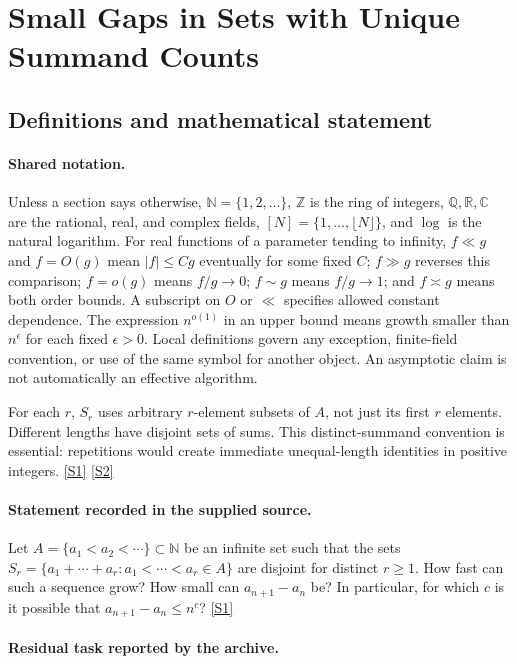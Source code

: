 \documentclass[11pt,a4paper]{article}
\newcommand{\N}{\mathbb{N}}
\newcommand{\Z}{\mathbb{Z}}
\newcommand{\Q}{\mathbb{Q}}
\newcommand{\R}{\mathbb{R}}
\newcommand{\C}{\mathbb{C}}
\newcommand{\sref}[2]{\hyperlink{source:#1:#2}{[S#2]}}
\begin{document}
\section{Small Gaps in Sets with Unique Summand Counts}\label{statement}


\subsection{Definitions and mathematical statement}

\paragraph{Shared notation.}Unless a section says otherwise, $\N=\{1,2,\ldots\}$,
$\Z$ is the ring of integers, $\Q,\R,\C$ are the rational, real, and complex
fields, $[N]=\{1,\ldots,\lfloor N\rfloor\}$, and $\log$ is the natural
logarithm. For real functions of a parameter tending to infinity,
$f\ll g$ and $f=O(g)$ mean $|f|\leq Cg$ eventually for some fixed $C$;
$f\gg g$ reverses this comparison; $f=o(g)$ means $f/g\to0$;
$f\sim g$ means $f/g\to1$; and $f\asymp g$ means both order bounds.
A subscript on $O$ or $\ll$ specifies allowed constant dependence.
The expression $n^{o(1)}$ in an upper bound means growth smaller than
$n^\epsilon$ for each fixed $\epsilon>0$. Local definitions govern any
exception, finite-field convention, or use of the same symbol for another
object. An asymptotic claim is not automatically an effective algorithm.



For each $r$, $S_r$ uses arbitrary $r$-element subsets of $A$, not just its first $r$ elements. Different lengths have disjoint sets of sums. This distinct-summand convention is essential: repetitions would create immediate unequal-length identities in positive integers. \sref{statement}{1} \sref{statement}{2}

\paragraph{Statement recorded in the supplied source.}
Let $A=\{a_1<a_2<\cdots\}\subset \mathbb{N}$ be an infinite set such that the sets $ S_r = \{ a_1+\cdots +a_r : a_1<\cdots<a_r\in A\} $ are disjoint for distinct $r\geq 1$. How fast can such a sequence grow? How small can $a_{n+1}-a_n$ be? In particular, for which $c$ is it possible that $a_{n+1}-a_n\leq n^{c}$? \sref{statement}{1}

\paragraph{Residual task reported by the archive.}
\end{document}
